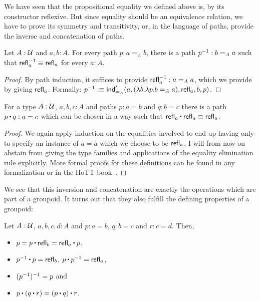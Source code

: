 We have seen that the propositional equality we defined above is, by its constructor
reflexive.
But since equality should be an equivalence relation, we have to prove its
symmetry and transitivity, or, in the language of paths, provide the inverse and
concatenation of paths.

\begin{defn}
Let $A : \mathcal{U}$ and $a, b : A$.
For every path $p : a =_A b$, there is a path $p^{-1} : b =_A a$ such that
$\mathsf{refl}_a^{-1} \equiv \mathsf{refl}_a$ for every $a : A$.
\end{defn}

\begin{proof}
By path induction, it suffices to provide $\mathsf{refl}_a^{-1} : a =_A a$, which we provide
by giving $\mathsf{refl}_a$. Formally:
$p^{-1} :\equiv \mathsf{ind}'_{=_A}(a, (\lambda b. \lambda p. b =_A a), \mathsf{refl}_a, b, p)$.
\end{proof}

\begin{defn}
For a type $A : \mathcal{U}$, $a, b, c : A$ and paths $p : a = b$ and $q : b = c$ there
is a path $p \ct q : a = c$ which can be chosen in a way such that
$\refl_a \ct \refl_a \equiv \refl_a$.
\end{defn}

\begin{proof}
We again apply induction on the equalities involved to end up having only to
specify an instance of $a = a$ which we choose to be $\mathsf{refl}_a$.
I will from now on abstain from giving the type families and applications
of the equality elimination rule explicitly.
More formal proofs for these definitions can be found in any formalization or
in the HoTT book~\cite{hottbook}.
\end{proof}

We see that this inversion and concatenation are exactly the operations which are
part of a groupoid.
It turns out that they also fulfill the defining properties of a groupoid:

\begin{defn}
Let $A : \mathcal{U}$, $a, b, c, d : A$ and $p : a = b$, $q : b = c$ and $r : c = d$.
Then,
\begin{itemize}
\item $p = p \ct \refl_b = \refl_a \ct p$,
\item $p\inv \ct p = \refl_b$, $p \ct p\inv = \refl_a$,
\item $(p^{-1})^{-1} = p$ and
\item $p \ct (q \ct r) = (p \ct q) \ct r$.
\end{itemize}
\end{defn}

